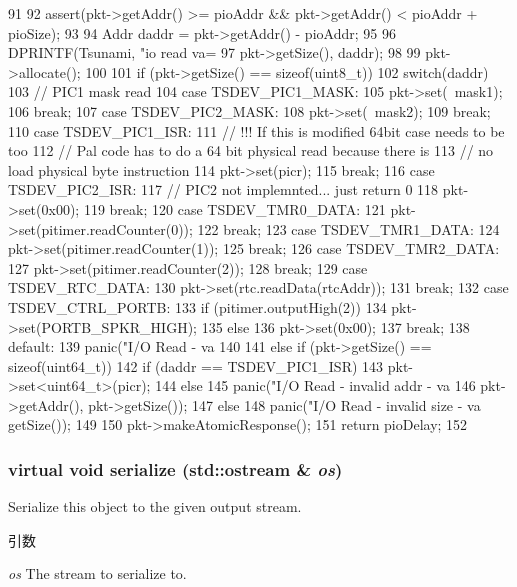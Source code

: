 \begin{DoxyCode}
91 {
92     assert(pkt->getAddr() >= pioAddr && pkt->getAddr() < pioAddr + pioSize);
93 
94     Addr daddr = pkt->getAddr() - pioAddr;
95 
96     DPRINTF(Tsunami, "io read  va=%
97             pkt->getSize(), daddr);
98 
99     pkt->allocate();
100 
101     if (pkt->getSize() == sizeof(uint8_t)) {
102         switch(daddr) {
103           // PIC1 mask read
104           case TSDEV_PIC1_MASK:
105             pkt->set(~mask1);
106             break;
107           case TSDEV_PIC2_MASK:
108             pkt->set(~mask2);
109             break;
110           case TSDEV_PIC1_ISR:
111               // !!! If this is modified 64bit case needs to be too
112               // Pal code has to do a 64 bit physical read because there is
113               // no load physical byte instruction
114               pkt->set(picr);
115               break;
116           case TSDEV_PIC2_ISR:
117               // PIC2 not implemnted... just return 0
118               pkt->set(0x00);
119               break;
120           case TSDEV_TMR0_DATA:
121             pkt->set(pitimer.readCounter(0));
122             break;
123           case TSDEV_TMR1_DATA:
124             pkt->set(pitimer.readCounter(1));
125             break;
126           case TSDEV_TMR2_DATA:
127             pkt->set(pitimer.readCounter(2));
128             break;
129           case TSDEV_RTC_DATA:
130             pkt->set(rtc.readData(rtcAddr));
131             break;
132           case TSDEV_CTRL_PORTB:
133             if (pitimer.outputHigh(2))
134                 pkt->set(PORTB_SPKR_HIGH);
135             else
136                 pkt->set(0x00);
137             break;
138           default:
139             panic("I/O Read - va%
140         }
141     } else if (pkt->getSize() == sizeof(uint64_t)) {
142         if (daddr == TSDEV_PIC1_ISR)
143             pkt->set<uint64_t>(picr);
144         else
145            panic("I/O Read - invalid addr - va %
146                    pkt->getAddr(), pkt->getSize());
147     } else {
148        panic("I/O Read - invalid size - va %
      getSize());
149     }
150     pkt->makeAtomicResponse();
151     return pioDelay;
152 }
\end{DoxyCode}
\hypertarget{classTsunamiIO_ad6272f80ae37e8331e3969b3f072a801}{
\subsubsection[{serialize}]{\setlength{\rightskip}{0pt plus 5cm}virtual void serialize (std::ostream \& {\em os})}}
\label{classTsunamiIO_ad6272f80ae37e8331e3969b3f072a801}
Serialize this object to the given output stream. 
\begin{DoxyParams}{引数}
\item[{\em os}]The stream to serialize to. \end{DoxyParams}


